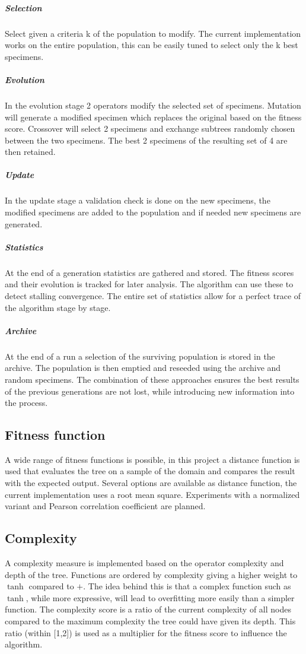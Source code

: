 \documentclass[10pt]{extarticle}
\begin{document}
\subparagraph{Selection}
Select given a criteria k of the population to modify. The current implementation works on the entire population, this can be easily tuned to select only the k best specimens.

\subparagraph{Evolution}
In the evolution stage 2 operators modify the selected set of specimens.
Mutation will generate a modified specimen which replaces the original based on the fitness score.
Crossover will select 2 specimens and exchange subtrees randomly chosen between the two specimens. The best 2 specimens of the resulting set of 4 are then retained.

\subparagraph{Update}
In the update stage a validation check is done on the new specimens, the modified specimens are added to the population and if needed new specimens are generated.

\subparagraph{Statistics}
At the end of a generation statistics are gathered and stored. The fitness scores and their evolution is tracked for later analysis.
The algorithm can use these to detect stalling convergence.
The entire set of statistics allow for a perfect trace of the algorithm stage by stage.

\subparagraph{Archive}
At the end of a run a selection of the surviving population is stored in the archive. 
The population is then emptied and reseeded using the archive and random specimens. The combination of these approaches ensures the best results of the previous generations are not lost, while introducing new information into the process.


\subsection{Fitness function}
A wide range of fitness functions is possible, in this project a distance function is used that evaluates the tree on a sample of the domain and compares the result with the expected output. 
Several options are available as distance function, the current implementation uses a root mean square. Experiments with a normalized variant and Pearson correlation coefficient are planned. 

\subsection{Complexity}
A complexity measure is implemented based on the operator complexity and depth of the tree. Functions are ordered by complexity giving a higher weight to $\tanh$ compared to $+$. The idea behind this is that a complex function such as $\tanh$, while more expressive, will lead to overfitting more easily than a simpler function. The complexity score is a ratio of the current complexity of all nodes compared to the maximum complexity the tree could have given its depth. This ratio (within [1,2]) is used as a multiplier for the fitness score to influence the algorithm. 
\end{document}
